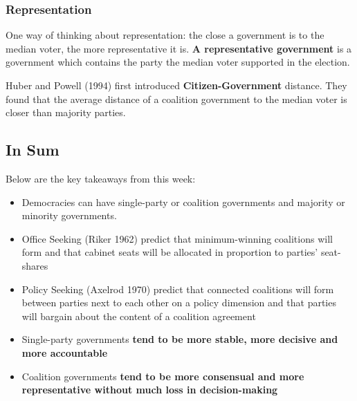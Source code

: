 \documentclass[12pt, letterpaper]{article}
\begin{document}
\subsubsection{Representation}
One way of thinking about representation: the close a government is to the median voter, the more representative it is. \textbf{A representative government} is a government which contains the party the median voter supported in the election.

Huber and Powell (1994) first introduced \textbf{Citizen-Government} distance. They found that the average distance of a coalition government to the median voter is closer than majority parties.

\subsection{In Sum}
Below are the key takeaways from this week:
\begin{itemize}
	\item Democracies can have single-party or coalition governments and majority or minority governments.
	\item Office Seeking (Riker 1962) predict that minimum-winning coalitions will form and that cabinet seats will be allocated in proportion to parties' seat-shares
	\item Policy Seeking (Axelrod 1970) predict that connected coalitions will form between parties next to each other on a policy dimension and that parties will bargain about the content of a coalition agreement
	\item Single-party governments \textbf{tend to be more stable, more decisive and more accountable}
	\item Coalition governments \textbf{tend to be more consensual and more representative without much loss in decision-making}
\end{itemize}

\newpage
\end{document}
